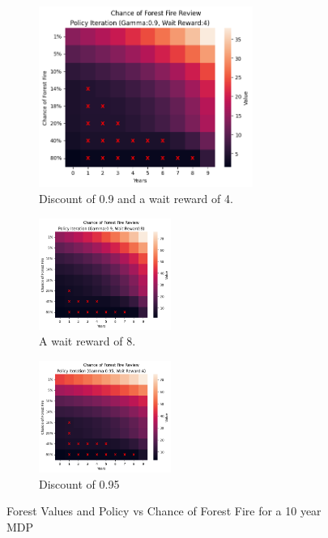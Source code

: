 \documentclass[letterpaper]{article} %
\begin{document}
\begin{figure}[!htb]
 	\begin{subfigure}[b]{0.45\textwidth}
	\centering
		\includegraphics[width=2.75in]{Figures/Chance_of_Forest_Fire_Review_Policy_Iteration_Gamma_0_9__Wait_Reward_4.png}
		\caption{Discount of 0.9 and a wait reward of 4. }
  	\end{subfigure}
	\centering
	 \begin{subfigure}[b]{0.235\textwidth}
		\includegraphics[width=1.7in]{Figures/Chance_of_Forest_Fire_Review_Policy_Iteration_Gamma_0_9__Wait_Reward_8.png}
		\caption{A wait reward of 8. }
  	\end{subfigure}%
	\begin{subfigure}[b]{0.235\textwidth}
		\includegraphics[width=1.7in]{Figures/Chance_of_Forest_Fire_Review_Policy_Iteration_Gamma_0_95__Wait_Reward_4.png}
		\caption{Discount of 0.95}
  	\end{subfigure}
\caption{Forest Values and Policy vs Chance of Forest Fire for a 10 year MDP}
\label{fig:forest_fire_base}
\end{figure}
\end{document}
